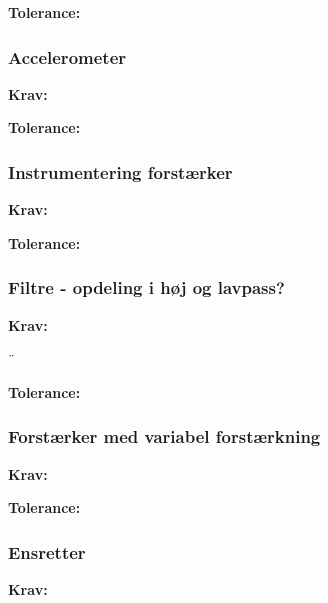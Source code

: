 \textbf{Tolerance:}
\begin{itemize}
\end{itemize}

\subsubsection{Accelerometer}
\textbf{Krav:}
\begin{itemize}

\end{itemize}

\textbf{Tolerance:}
\begin{itemize}
\end{itemize}

\subsubsection{Instrumentering forstærker}
\textbf{Krav:}
\begin{itemize}

\end{itemize}

\textbf{Tolerance:}
\begin{itemize}
\end{itemize}

\subsubsection{Filtre - opdeling i høj og lavpass?}
\textbf{Krav:}
\begin{itemize}

\end{itemize}¨

\textbf{Tolerance:}
\begin{itemize}
\end{itemize}
\subsubsection{Forstærker med variabel forstærkning}
\textbf{Krav:}
\begin{itemize}

\end{itemize}

\textbf{Tolerance:}
\begin{itemize}
\end{itemize}

\subsubsection{Ensretter}
\textbf{Krav:}
\begin{itemize}

\end{itemize}

